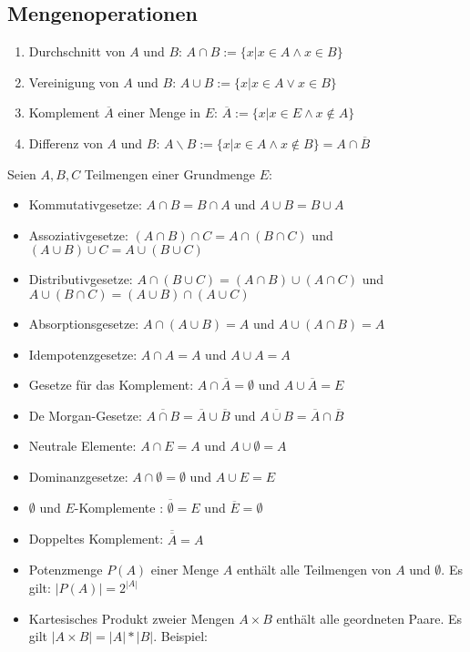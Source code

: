 \documentclass[12pt,landscape]{article}
\begin{document}
\begin{multicols}{3}
\subsection{Mengenoperationen}
\begin{enumerate}
\item Durchschnitt von $A$ und $B$: $A \cap B := \{x | x \in A \wedge x \in B\}$
\item Vereinigung von $A$ und $B$: $A \cup B := \{x | x \in A \vee x \in B\}$
\item Komplement $\overline{A}$ einer Menge in $E$: $\overline{A} := \{x | x \in E \wedge x \notin A\}$
\item Differenz von $A$ und $B$: $A \backslash B := \{x | x \in A \wedge x \notin B\} = A \cap \overline{B}$
\end{enumerate}
Seien $A, B, C$ Teilmengen einer Grundmenge $E$:
\begin{itemize}
\item Kommutativgesetze: $A \cap B = B \cap A$ und $A \cup B = B \cup A$
\item Assoziativgesetze: $(A \cap B) \cap C = A \cap (B \cap C)$ und $(A \cup B) \cup C = A \cup (B \cup C)$
\item Distributivgesetze: $A \cap (B \cup C) = (A \cap B) \cup (A \cap C)$ und $A \cup (B \cap C) = (A \cup B) \cap (A \cup C)$
\item Absorptionsgesetze: $A \cap (A \cup B) = A$ und $A \cup (A \cap B) = A$
\item Idempotenzgesetze: $A \cap A = A$ und $A \cup A = A$
\item Gesetze für das Komplement: $A \cap \overline{A} = \emptyset$ und $A \cup \overline{A} = E$
\item De Morgan-Gesetze: $\overline{A \cap B} = \overline{A} \cup \overline{B}$ und $\overline{A \cup B} = \overline{A} \cap \overline{B}$
\item Neutrale Elemente: $A \cap E = A$ und $A \cup \emptyset = A$
\item Dominanzgesetze: $A \cap \emptyset = \emptyset$ und $A \cup E = E$
\item $\emptyset$ und $E$-Komplemente : $\overline{\emptyset} = E$ und $\overline{E} = \emptyset$
\item Doppeltes Komplement: $\overline{\overline{A}} = A$
\item Potenzmenge $P(A)$ einer Menge $A$ enthält alle Teilmengen von $A$ und $\emptyset$. Es gilt: $|P(A)| = 2^{|A|}$
\item Kartesisches Produkt zweier Mengen $A \times B$ enthält alle geordneten Paare. Es gilt $|A \times B| = |A| * |B|$. Beispiel: 
\end{itemize}

\end{multicols}
\end{document}

